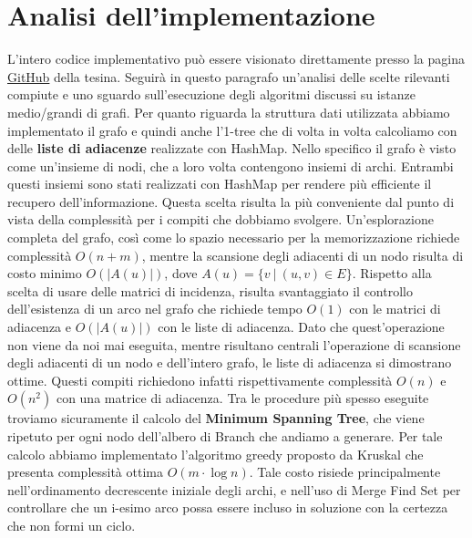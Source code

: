 \documentclass[
    article,            %
    12pt,                %
    oneside,            %
    a4paper,            %
    english,            %
    italian,                %
    sumario=tradicional,
]{abntex2}
\begin{document}
    \section{Analisi dell'implementazione}\label{sec:analisi-dell'implementazione}
    L'intero codice implementativo può essere visionato direttamente presso la pagina \href{https://github.com/LorenzoSciandra/Branch-and-BoundTSP}{GitHub} della tesina.
    Seguirà in questo paragrafo un'analisi delle scelte rilevanti compiute e uno sguardo sull'esecuzione degli algoritmi discussi su istanze medio/grandi di grafi.
    \newline
    \newline
    Per quanto riguarda la struttura dati utilizzata abbiamo implementato il grafo e quindi anche l'1-tree che di volta in volta calcoliamo con delle \textbf{liste di adiacenze} realizzate con HashMap.
    Nello specifico il grafo è visto come un'insieme di nodi, che a loro volta contengono insiemi di archi.
    Entrambi questi insiemi sono stati realizzati con HashMap per rendere più efficiente il recupero dell'informazione.
    Questa scelta risulta la più conveniente dal punto di vista della complessità per i compiti che dobbiamo svolgere.
    Un'esplorazione completa del grafo, così come lo spazio necessario per la memorizzazione richiede complessità $O(n+m)$, mentre la scansione degli adiacenti di un nodo risulta di costo minimo $O(|A(u)|)$, dove $A(u) = \{v \:|\: (u,v) \in E\}$.
    \newline
    Rispetto alla scelta di usare delle matrici di incidenza, risulta svantaggiato il controllo dell'esistenza di un arco nel grafo che richiede tempo $O(1)$ con le matrici di adiacenza e $O(|A(u)|)$ con le liste di adiacenza.
    Dato che quest'operazione non viene da noi mai eseguita, mentre risultano centrali l'operazione di scansione degli adiacenti di un nodo e dell'intero grafo, le liste di adiacenza si dimostrano ottime.
    Questi compiti richiedono infatti rispettivamente complessità $O(n)$ e $O(n^2)$ con una matrice di adiacenza.
    \newline
    \newline
    Tra le procedure più spesso eseguite troviamo sicuramente il calcolo del \textbf{Minimum Spanning Tree}, che viene ripetuto per ogni nodo dell'albero di Branch che andiamo a generare.
    Per tale calcolo abbiamo implementato l'algoritmo greedy proposto da Kruskal che presenta complessità ottima $O(m \cdot \log n)$.
    Tale costo risiede principalmente nell'ordinamento decrescente iniziale degli archi, e nell'uso di Merge Find Set per controllare che un i-esimo arco possa essere incluso in soluzione con la certezza che non formi un ciclo.
\end{document}
